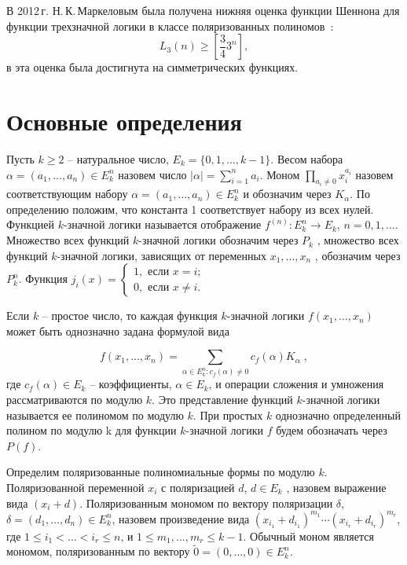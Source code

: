 \documentclass[bibliography=totoc, a4paper, 12pt]{extarticle}
\let\stdsection\section
\renewcommand\section{\newpage\stdsection}
\begin{document}
В 2012\,г. Н.\,К.\,Маркеловым была получена нижняя оценка функции Шеннона для
функции трехзначной логики в классе поляризованных полиномов~\cite{mn12}:
$$
L_3(n) \geqslant \left[\frac{3}{4}3^n\right],
$$
в \cite{ss15} эта оценка была достигнута на симметрических функциях.

\section{Основные определения}

Пусть $k \geqslant 2$ -- натуральное число, $E_k = \{0, 1, \dots, k - 1\}$.
Весом набора $\alpha = (a_1, \dots, a_n ) \in E_k^n$ назовем число $|\alpha| =
\sum\limits_{i=1}^n a_i$. Моном $\prod\limits_{a_i\neq0}x_i^{a_i}$ назовем
соответствующим набору $\alpha = (a_1, \dots, a_n ) \in E_k^n$ и обозначим через
$K_{\alpha}$. По определению положим, что константа 1 соответствует набору из
всех нулей. Функцией $k$\nobreakdash-значной логики называется отображение
$f^{(n)} : E_k^n \rightarrow E_k$, $n = 0, 1, \dots$. Множество всех функций
$k$-значной логики обозначим через $P_k$ , множество всех функций $k$-значной
логики, зависящих от переменных $x_1, \dots, x_n$ , обозначим через $P_k^n$.
Функция $j_i(x) = \begin{cases} 1, \text{ если } x = i; \\ 0, \text{ если } x
\neq i. \end{cases}$

Если $k$ -- простое число, то каждая функция $k$\nobreakdash-значной логики
$f(x_1 , \dots , x_n)$ может быть однозначно задана формулой вида

$$ f(x_1, \dots, x_n) = \sum_{\alpha \in E_k^n:c_f(\alpha) \neq
0}c_f(\alpha)K_\alpha \; ,$$ где $c_f(\alpha) \in E_k$ -- коэффициенты, $\alpha
\in E_k$, и операции сложения и умножения рассматриваются по модулю $k$. Это
представление функций $k$\nobreakdash-значной логики называется ее полиномом по
модулю $k$. При простых $k$ однозначно определенный полином по модулю k для
функции $k$\nobreakdash-значной логики $f$ будем обозначать через $P(f)$.

Определим поляризованные полиномиальные формы по модулю $k$. Поляризованной
переменной $x_i$ с поляризацией $d$, $d \in E_k$ , назовем выражение вида $(x_i+
d)$. Поляризованным мономом по вектору поляризации $\delta$, $\delta = (d_1,
\dots, d_n) \in E_k^n$, назовем произведение вида $(x_{i_1} + d_{i_1}
)^{m_1}\cdots(x_{i_r} + d_{i_r})^{m_r}$, где $1 \leqslant i_1 < \ldots < i_r
\leqslant n$, и $1 \leqslant m_1 , \dots , m_r \leqslant k - 1$. Обычный моном
является мономом, поляризованным по вектору $\tilde{0} = (0, \dots, 0) \in
E_k^n$.
\end{document}
